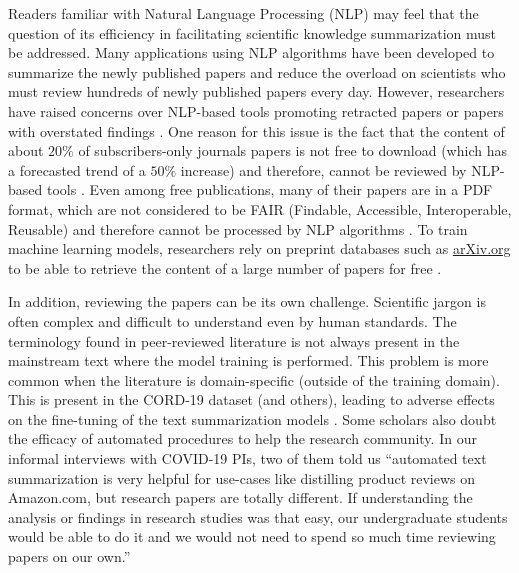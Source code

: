 \documentclass[acmsmall,authordraft]{acmart}
\begin{document}
Readers familiar with Natural Language Processing (NLP) may feel that the question of its efficiency in facilitating scientific knowledge summarization must be addressed. Many applications using NLP algorithms have been developed to summarize the newly published papers and reduce the overload on scientists who must review hundreds of newly published papers every day. However, researchers have raised concerns over NLP-based tools promoting retracted papers or papers with overstated findings \citep{Brainard2020drowning}. One reason for this issue is the fact that the content of about $20\%$ of subscribers-only journals papers is not free to download (which has a forecasted trend of a $50\%$ increase) and therefore, cannot be reviewed by NLP-based tools \citep{Brainard2020drowning}. Even among  free publications, many of their papers are in a PDF format, which are not considered to be FAIR (Findable, Accessible, Interoperable, Reusable) and therefore cannot be processed by NLP algorithms \citep{oelen2020generate}. To train machine learning models, researchers rely on preprint databases such as \url{arXiv.org} to be able to retrieve the content of a large number of papers for free \citep{Brainard2020drowning}.

In addition, reviewing the papers can be its own challenge. Scientific jargon is often complex and difficult to understand even by human standards. The terminology found in peer-reviewed literature is not always present in the mainstream text where the model training is performed. This problem is more common when the literature is domain-specific (outside of the training domain). This is present in the CORD-19 dataset (and others), leading to adverse effects on the fine-tuning of the text summarization models \citep{kieuvongngam2020automatic}. Some scholars also doubt the efficacy of automated procedures to help the research community. In our informal interviews with COVID-19 PIs, two of them told us ``automated text summarization is very helpful for use-cases like distilling product reviews on Amazon.com, but research papers are totally different. If understanding the analysis or findings in research studies was that easy, our undergraduate students would be able to do it and we would not need to spend so much time reviewing papers on our own.''
\end{document}
